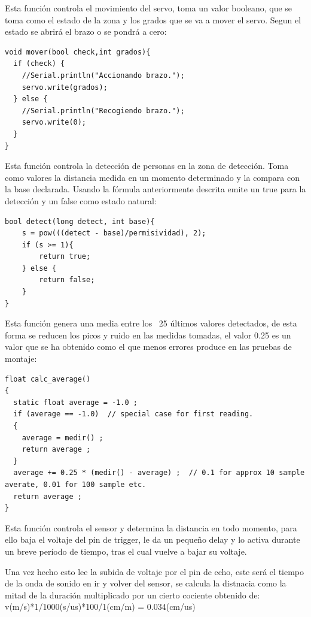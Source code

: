 \documentclass[12pt,twocolumn]{article}
\begin{document}
Esta función controla el movimiento
del servo, toma un valor booleano,
que se toma como el estado de la zona
y los grados que se va a mover el servo.
Segun el estado se abrirá el brazo o
se pondrá a cero:

\begin{lstlisting}[texcl=true]
void mover(bool check,int grados){
  if (check) {
    //Serial.println("Accionando brazo.");
    servo.write(grados);
  } else {
    //Serial.println("Recogiendo brazo.");
    servo.write(0);
  }
}
\end{lstlisting}

Esta función controla la detección
de personas en la zona de detección.
Toma como valores la distancia medida
en un momento determinado y la compara 
con la base declarada. Usando la 
fórmula anteriormente descrita emite
un true para la detección y un false
como estado natural:

\begin{lstlisting}[texcl=true]
bool detect(long detect, int base){
    s = pow(((detect - base)/permisividad), 2);
    if (s >= 1){
        return true;
    } else {
        return false;
    }
} 
\end{lstlisting}

Esta función genera una media entre los ~25 últimos valores detectados, de esta forma se reducen los picos y ruido en las medidas tomadas, el valor 0.25 es un valor que se ha obtenido como el que menos errores produce en las pruebas de montaje:

\begin{lstlisting}[texcl=true]
float calc_average()
{
  static float average = -1.0 ;
  if (average == -1.0)  // special case for first reading.
  {
    average = medir() ;
    return average ;
  }
  average += 0.25 * (medir() - average) ;  // 0.1 for approx 10 sample averate, 0.01 for 100 sample etc.
  return average ;
}

\end{lstlisting}

Esta función controla el sensor 
y determina la distancia en todo 
momento, para ello baja el voltaje 
del pin de trigger, le da un pequeño
delay y lo activa durante un breve
período de tiempo, tras el cual 
vuelve a bajar su voltaje.

Una vez hecho esto lee la subida 
de voltaje por el pin de echo, este
será el tiempo de la onda de sonido
en ir y volver del sensor, se calcula 
la distnacia como la mitad de la 
duración multiplicado por un cierto
cociente obtenido de: 
v(m/s)*1/1000(s/us)*100/1(cm/m) = 0.034(cm/us)
\end{document}
